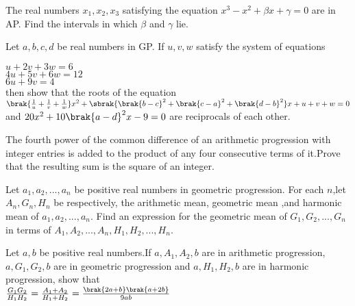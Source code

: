 	      \hfill {}
       

		\item  The real numbers $ x_{1},x_{2},x_{3} $ satisfying the equation $ x^{3}-x^{2}+\beta x+\gamma=0 $ are in AP. Find the intervals in which $ \beta $ and $\gamma$ lie.
       
			\hfill {}
      

      \item  Let $ a,b,c,d $ be real numbers in GP. If $u,v,w$ satisfy the system of equations  
    
	      \hfill {}
      
      $    u+2v+3w=6 $ \\
      $    4u+5v+6w=12 $ \\
      $    6u+9v=4 $ \\
      then show that the roots of the equation \\
		$\brak{\frac{1}{u}+\frac{1}{v}+\frac{1}{w}}x^{2}+\sbrak{\brak{b-c}^{2}+\brak{c-a}^{2}+\brak{d-b}^{2}}x+u+v+w=0 $ and $ 20x^{2}+10\brak{a-d}^{2}x-9=0 $ are reciprocals of each other.

      \item The fourth power of the common difference of an arithmetic progression with integer entries is added to the product of any four consecutive terms of it.Prove that the resulting sum is the square of an integer.
      
	      \hfill {}
    

      \item Let $ a_{1},a_{2},...,a_{n} $ be positive real numbers in geometric progression. For each $n$,let $ A_{n},G_{n},H_{n} $ be respectively, the arithmetic mean, geometric mean ,and harmonic mean of $ a_{1},a_{2},...,a_{n}.$ Find an expression for the geometric mean of $ G_{1},G_{2},...,G_{n} $ in terms of $ A_{1},A_{2},...,A_{n},H_{1},H_{2},...,H_{n}.$ 
      
	      \hfill {}                              
       
       \item Let $a,b$ be positive real numbers.If $ a,A_{1},A_{2},b $ are in arithmetic progression, $ a,G_{1},G_{2},b $ are in geometric progression and $ a,H_{1},H_{2},b $ are in harmonic progression, show that \\ 
	       $ \frac{G_{1}G_{2}}{H_{1}H_{2}}=\frac{A_{1}+A_{2}}{H_{1}+H_{2}}=\frac{\brak{2a+b}\brak{a+2b}}{9ab} $ 

